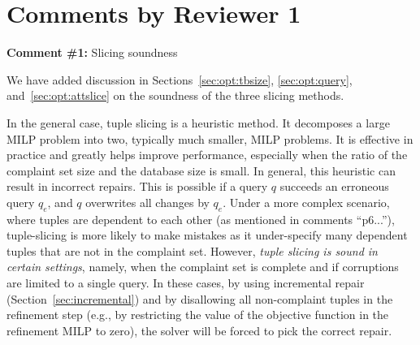 \section*{Comments by Reviewer 1}

\noindent
\textbf{Comment \#1:} Slicing soundness
\begin{quote}
\end{quote}

We have added discussion in Sections~\ref{sec:opt:tbsize},
\ref{sec:opt:query}, and~\ref{sec:opt:attslice} on the soundness of the three
slicing methods.   


In the general case, tuple slicing is a heuristic method. It decomposes a
large MILP problem into two, typically much smaller, MILP problems. It is
effective in practice and greatly helps improve \sys performance, especially
when the ratio of the complaint set size and the database size is small. In
general, this heuristic can result in incorrect repairs. This is possible if a
query $q$ succeeds an erroneous query $q_e$, and $q$ overwrites all changes by
$q_e$. Under a more complex scenario, where tuples are dependent to 
each other (as mentioned in comments ``p6...''), tuple-slicing is more likely 
to make mistakes as it under-specify many dependent tuples that are 
not in the complaint set. 
However, \emph{tuple slicing is sound in certain settings}, namely,
when the complaint set is complete and if corruptions are limited to a single
query. In these cases, by using incremental repair
(Section~\ref{sec:incremental}) and by disallowing all non-complaint tuples in
the refinement step (e.g., by restricting the value of the objective function
in the refinement MILP to zero), the solver will be forced to pick the correct
repair.

